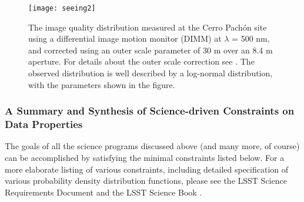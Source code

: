 \begin{figure}
\texttt{[image: seeing2]}
\caption{
The image quality distribution measured at the Cerro Pach\'{o}n site using
a differential image motion monitor (DIMM) at $\lambda$ = 500 nm, and corrected
using an outer scale parameter of 30 m over an 8.4 m aperture. For details
about the outer scale correction see \citet{2002PASP..114.1156T}. The observed distribution
is well described by a log-normal distribution, with the parameters shown in
the figure.}
\label{Fig:seeing}
\end{figure}

\subsubsection{A Summary and Synthesis of Science-driven Constraints on Data Properties}

The goals of all the science programs discussed above
(and many more, of course) can be accomplished by satisfying the
minimal constraints listed below. For a more elaborate listing
of various constraints, including detailed specification of
various probability density distribution functions, please see the LSST Science
Requirements Document \citep{LPM-17}
and the LSST Science Book \citep{2009arXiv0912.0201L}.

